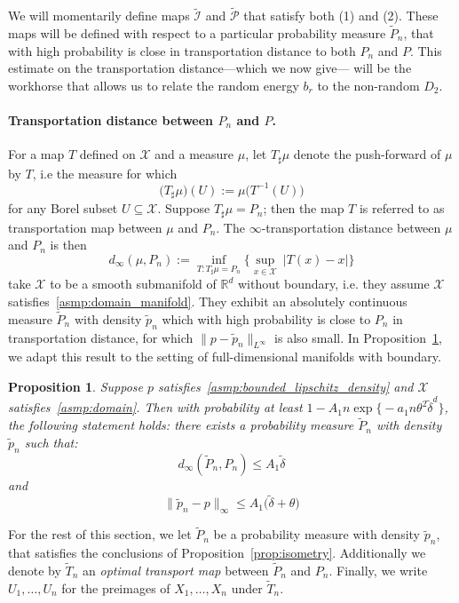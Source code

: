 \documentclass[twoside]{article}
\newcommand{\Reals}{\mathbb{R}}
\newcommand{\1}{\mathbf{1}}
\newcommand{\Rd}{\Reals^d}
\newcommand{\Xset}{\mathcal{X}}
\newcommand{\Leb}{L}
\newcommand{\mc}[1]{\mathcal{#1}}
\newcommand{\wt}[1]{\widetilde{#1}}
\newtheorem{proposition}{Proposition}
\theoremstyle{definition}
\theoremstyle{remark}
\begin{document}
We will momentarily define maps $\wt{\mc{I}}$ and $\wt{\mc{P}}$ that satisfy both (1) and (2). These maps will be defined with respect to a particular probability measure $\wt{P}_n$, that with high probability is close in transportation distance to both $P_n$ and $P$. This estimate on the transportation distance---which we now give--- will be the workhorse that allows us to relate the random energy $b_r$ to the non-random $D_2$.

\paragraph{Transportation distance between $P_n$ and $P$.}
For a map $T$ defined on $\Xset$ and a measure $\mu$, let $T_{\sharp}\mu$ denote the push-forward of $\mu$ by $T$, i.e the measure for which
\begin{equation*}
\bigl(T_{\sharp}\mu\bigr)(U) := \mu\bigl(T^{-1}(U)\bigr)
\end{equation*}
for any Borel subset $U \subseteq \Xset$. Suppose $T_{\sharp}\mu = P_n$; then the map $T$ is referred to as transportation map between $\mu$ and $P_n$. The  $\infty$-transportation distance between $\mu$ and $P_n$ is then
\begin{equation*}
d_{\infty}(\mu,P_n) := \inf_{T: T_{\sharp} \mu = P_n} \biggl\{\sup_{x \in \Xset}~\bigl|T(x) - x\bigr|\biggr\}
\end{equation*}
\cite{calder2019} take $\Xset$ to be a smooth submanifold of $\Rd$ without boundary, i.e. they assume $\Xset$ satisfies~\ref{asmp:domain_manifold}. They exhibit an absolutely continuous measure $\wt{P}_n$ with density $\wt{p}_n$ which with high probability is close to $P_n$ in transportation distance, for which $\|p - \wt{p}_n\|_{\Leb^\infty}$ is also small. In Proposition~\ref{prop:optimal_transport}, we adapt this result to  the setting of full-dimensional manifolds with boundary.  
\begin{proposition}
	\label{prop:optimal_transport}
	Suppose $p$ satisfies~\ref{asmp:bounded_lipschitz_density} and $\Xset$ satisfies~\ref{asmp:domain}. Then with probability at least $1 - A_1 n \exp\bigl\{-a_1 n\theta^2\wt{\delta}^d\bigr\}$, the following statement holds: there exists a probability measure $\wt{P}_n$ with density $\wt{p}_n$ such that:
	\begin{equation*}
	d_{\infty}(\wt{P}_n, P_n) \leq A_1 \wt{\delta}
	\end{equation*}
	and
	\begin{equation*}
	\|\wt{p}_n - p\|_{\infty} \leq A_1\bigl(\wt{\delta} + \theta\bigr)
	\end{equation*}
\end{proposition}
For the rest of this section, we let $\wt{P}_n$ be a probability measure with density $\wt{p}_n$, that satisfies the conclusions of Proposition~\ref{prop:isometry}. Additionally we denote by $\wt{T}_n$ an \emph{optimal transport map} between $\wt{P}_n$ and $P_n$. Finally, we write $U_1,\ldots,U_n$ for the preimages of $X_1,\ldots,X_n$ under $\wt{T}_n$. 
\end{document}
